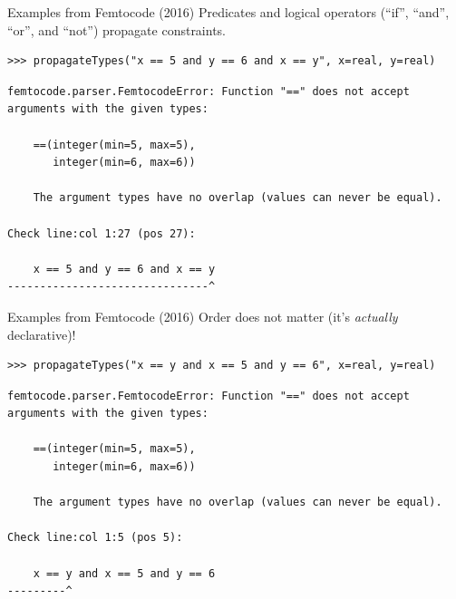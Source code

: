 \documentclass[aspectratio=169]{beamer}
\begin{document}
\begin{frame}[fragile]{Examples from Femtocode (2016)}
\vspace{0.5 cm}
Predicates and logical operators (``if'', ``and'', ``or'', and ``not'') propagate constraints.

\small
\begin{verbatim}
>>> propagateTypes("x == 5 and y == 6 and x == y", x=real, y=real)
\end{verbatim}
{\color{red}
\begin{verbatim}
femtocode.parser.FemtocodeError: Function "==" does not accept
arguments with the given types:

    ==(integer(min=5, max=5),
       integer(min=6, max=6))

    The argument types have no overlap (values can never be equal).

Check line:col 1:27 (pos 27):

    x == 5 and y == 6 and x == y
-------------------------------^
\end{verbatim}}
\end{frame}

\begin{frame}[fragile]{Examples from Femtocode (2016)}
\vspace{0.5 cm}
Order does not matter (it's {\it actually} declarative)!

\small
\begin{verbatim}
>>> propagateTypes("x == y and x == 5 and y == 6", x=real, y=real)
\end{verbatim}
{\color{red}
\begin{verbatim}
femtocode.parser.FemtocodeError: Function "==" does not accept
arguments with the given types:

    ==(integer(min=5, max=5),
       integer(min=6, max=6))

    The argument types have no overlap (values can never be equal).

Check line:col 1:5 (pos 5):

    x == y and x == 5 and y == 6
---------^
\end{verbatim}}
\end{frame}
\end{document}
